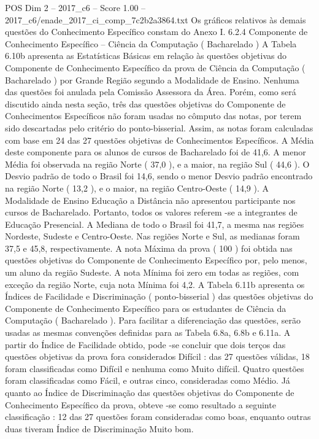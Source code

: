 \begin{textsample}{POS Dim 2 – 2017\_c6 – Score 1.00 – 2017\_c6/enade\_2017\_ci\_comp\_7c2b2a3864.txt}
Os gráficos relativos às demais questões do Conhecimento Específico constam do Anexo I. 6.2.4 Componente de Conhecimento Específico – Ciência da Computação ( Bacharelado ) A Tabela 6.10b apresenta as Estatísticas Básicas em relação às questões objetivas do Componente de Conhecimento Específico da prova de Ciência da Computação ( Bacharelado ) por Grande Região segundo a Modalidade de Ensino.
Nenhuma das questões foi anulada pela Comissão Assessora da Área.
Porém, como será discutido ainda nesta seção, três das questões objetivas do Componente de Conhecimentos Específicos não foram usadas no cômputo das notas, por terem sido descartadas pelo critério do ponto-bisserial.
Assim, as notas foram calculadas com base em 24 das 27 questões objetivas de Conhecimentos Específicos.
A Média deste componente para os alunos de cursos de Bacharelado foi de 41,6.
A menor Média foi observada na região Norte ( 37,0 ), e a maior, na região Sul ( 44,6 ).
O Desvio padrão de todo o Brasil foi 14,6, sendo o menor Desvio padrão encontrado na região Norte ( 13,2 ), e o maior, na região Centro-Oeste ( 14,9 ).
A Modalidade de Ensino Educação a Distância não apresentou participante nos cursos de Bacharelado.
Portanto, todos os valores referem -se a integrantes de Educação Presencial.
A Mediana de todo o Brasil foi 41,7, a mesma nas regiões Nordeste, Sudeste e Centro-Oeste.
Nas regiões Norte e Sul, as medianas foram 37,5 e 45,8, respectivamente.
A nota Máxima da prova ( 100 ) foi obtida nas questões objetivas do Componente de Conhecimento Específico por, pelo menos, um aluno da região Sudeste.
A nota Mínima foi zero em todas as regiões, com exceção da região Norte, cuja nota Mínima foi 4,2.
A Tabela 6.11b apresenta os Índices de Facilidade e Discriminação ( ponto-bisserial ) das questões objetivas do Componente de Conhecimento Específico para os estudantes de Ciência da Computação ( Bacharelado ).
Para facilitar a diferenciação das questões, serão usadas as mesmas convenções definidas para as Tabela 6.8a, 6.8b e 6.11a.
A partir do Índice de Facilidade obtido, pode -se concluir que dois terços das questões objetivas da prova fora considerados Difícil : das 27 questões válidas, 18 foram classificadas como Difícil e nenhuma como Muito difícil.
Quatro questões foram classificadas como Fácil, e outras cinco, consideradas como Médio.
Já quanto ao Índice de Discriminação das questões objetivas do Componente de Conhecimento Específico da prova, obteve -se como resultado a seguinte classificação : 12 das 27 questões foram consideradas como boas, enquanto outras duas tiveram Índice de Discriminação Muito bom.

\end{textsample}
